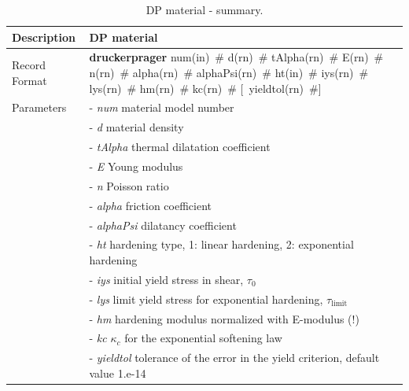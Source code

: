 \documentclass[epsf,a4paper]{article}
\newcommand{\descitem}[1]{{\noindent \bf #1}}
\newcommand{\elemparam}[2]{{{#1\tiny (#2)}~\#}}
\newcommand{\optelemparam}[2]{[{~\elemparam{#1}{#2}}]}
\newcommand{\param}[1]{{\it #1}}
\begin{document}
\begin{table}[h]                                                                
\begin{tabular}{|l|p{9cm}|}                                                      
\hline                                                                          
Description & DP material\\
\hline                                                                          
Record Format & \descitem{druckerprager} \elemparam{num}{in}
\elemparam{d}{rn} \elemparam{tAlpha}{rn} \elemparam{E}{rn} \elemparam{n}{rn}
\elemparam{alpha}{rn} \elemparam{alphaPsi}{rn} \elemparam{ht}{in}
\elemparam{iys}{rn} \elemparam{lys}{rn} \elemparam{hm}{rn} \elemparam{kc}{rn} \optelemparam{yieldtol}{rn} \\
Parameters &- \param{num} material model number\\
&- \param{d} material density\\
&- \param{tAlpha} thermal dilatation coefficient\\
&- \param{E} Young modulus\\
&- \param{n} Poisson ratio\\
&- \param{alpha} friction coefficient\\
&- \param{alphaPsi}  dilatancy coefficient\\
&- \param{ht} hardening type, 1: linear hardening, 2: exponential
hardening\\
&- \param{iys} initial yield stress in shear, $\tau_0$\\
&- \param{lys} limit yield stress for exponential hardening, $\tau_{\mathrm{limit}}$\\
&- \param{hm} hardening modulus normalized with E-modulus (!)\\
&- \param{kc} $\kappa_c$ for the exponential softening law\\
&- \param{yieldtol} tolerance of the error in the yield criterion, default value
1.e-14\\
\hline
\end{tabular}                                                                   
\caption{DP material - summary.}                
\label{DP_table}                                                         
\end{table}                                                                     
\end{document}
